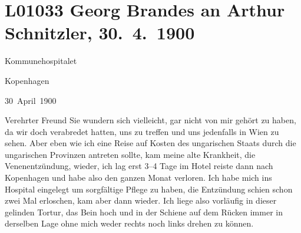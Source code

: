 

\section[Georg Brandes an Arthur Schnitzler, 30. 4. 1900]{L01033 Georg Brandes an Arthur Schnitzler, 30. 4. 1900}
\nopagebreak{}
\rehead{ }\normalsize\beginnumbering{}
\toendnotes[C]{\smallbreak\pagebreak[2]}
\toendnotes[C]{\smallbreak}
\toendnotes[C]{\smallbreak}
\pstart
           \raggedleft{}{\pb}Kommunehospitalet\pend
           
\pstart
           \raggedleft{}Kopenhagen\pend
           
\pstart
           \raggedleft{}30 April 1900\pend
           
\pstart{}Verehrter Freund\pend\vspace{0.5em}
\pstart
           Sie wundern sich vielleicht, gar nicht von mir gehört zu haben, da wir doch
               verabredet hatten, uns zu treffen und uns jedenfalls in Wien zu sehen. Aber eben wie ich eine Reise auf Kosten des ungarischen Staats durch die ungarischen Provinzen antreten sollte, kam meine alte Krankheit,
               die Venenentzündung, wieder, ich lag erst 3–4 Tage im Hotel reiste dann nach Kopenhagen und habe also den ganzen Monat
               verloren. Ich habe mich ins Hospital eingelegt um sorgfältige Pflege zu haben, die
               Entzündung schien schon zwei Mal erloschen, kam aber dann wieder. Ich liege also
               vorläufig in dieser gelinden Tortur, das Bein hoch und in der Schiene {\pb}auf dem Rücken immer in derselben
               Lage ohne mich weder rechts noch links drehen zu können.\pend
           
